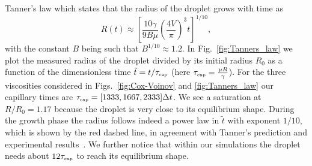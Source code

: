 Tanner's law which states that the radius of the droplet grows with time as
\begin{equation}
\label{eq:tanners_law}
    R(t)\approx \left[\frac{10\gamma}{9B\mu}\left(\frac{4V}{\pi}\right)^3 t\right]^{1/10},
\end{equation}
with the constant $B$ being such that $B^{1/10} \approx 1.2$.  
In Fig.~\ref{fig:Tanners_law} we plot the measured radius of the droplet divided by its initial radius $R_0$ as a function of the dimensionless time $\tilde{t} = t/\tau_{\mbox{\tiny{cap}}}$ (here $\tau_{\mbox{\tiny{cap}}} = \frac{\mu R}{\gamma}$). 
For the three viscosities considered in Figs.~\ref{fig:Cox-Voinov} and \ref{fig:Tanners_law} our capillary times are $\tau_{\mbox{\tiny{cap}}} = [1333, 1667, 2333] \Delta t$. 
We see a saturation at $R/R_0=1.17$ because the droplet is very close to its equilibrium shape. 
During the growth phase the radius follows indeed a power law in $\tilde{t}$ with exponent $1/10$, which is shown by the red dashed line, in agreement with Tanner's prediction and experimental results~\cite{riobooTimeEvolutionLiquid2002, jambon-puilletSpreadingDynamicsContact2018, cazabatDynamicsWettingEffects1986, chenExperimentsSpreadingDrop1988}.
We further notice that within our simulations the droplet needs about $12\tau_{\mbox{\tiny{cap}}}$ to reach its equilibrium shape.

